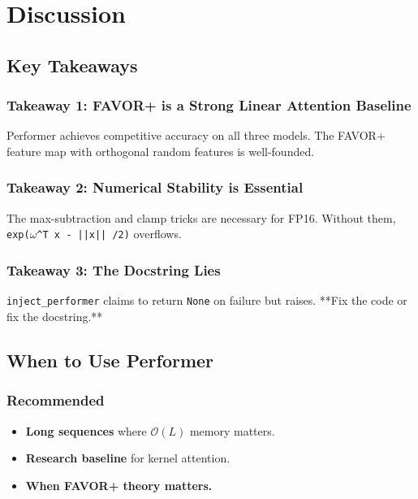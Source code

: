 
\section{Discussion}

\subsection{Key Takeaways}

\subsubsection{Takeaway 1: FAVOR+ is a Strong Linear Attention Baseline}

Performer achieves competitive accuracy on all three models. The FAVOR+ 
feature map with orthogonal random features is well-founded.

\subsubsection{Takeaway 2: Numerical Stability is Essential}

The max-subtraction and clamp tricks are necessary for FP16. Without them, 
\texttt{exp($\omega$^T x - ||x|| /2)} overflows.

\subsubsection{Takeaway 3: The Docstring Lies}

\texttt{inject\_performer} claims to return \texttt{None} on failure but raises. **Fix 
the code or fix the docstring.**

\subsection{When to Use Performer}

\subsubsection{Recommended}

\begin{itemize}
\item \textbf{Long sequences} where $\mathcal{O}(L)$ memory matters.
\item \textbf{Research baseline} for kernel attention.
\item \textbf{When FAVOR+ theory matters.}

\end{itemize}
